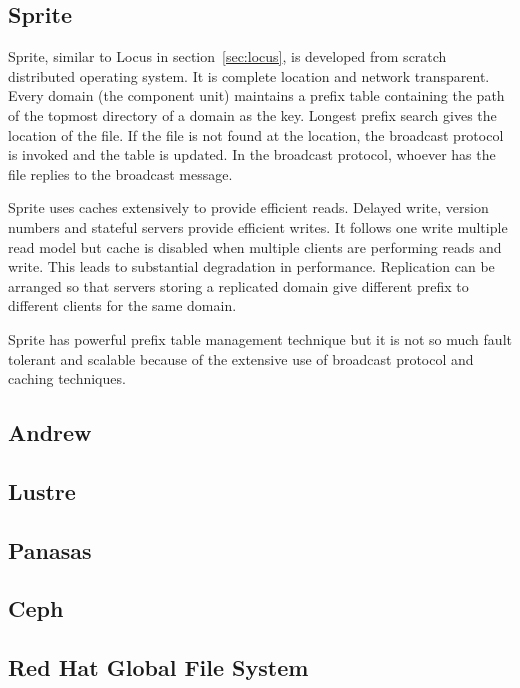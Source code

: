 \documentclass[a4paper,12pt]{article}
\begin{document}
\subsection{Sprite \cite[p.~357]{old_dfs}}
Sprite, similar to Locus in section~\ref{sec:locus}, is developed from scratch distributed operating system. It is complete location and network transparent. Every domain (the component unit) maintains a prefix table containing the path of the topmost directory of a domain as the key. Longest prefix search gives the location of the file. If the file is not found at the location, the broadcast protocol is invoked and the table is updated. In the broadcast protocol, whoever has the file replies to the broadcast message.

Sprite uses caches extensively to provide efficient reads. Delayed write, version numbers and stateful servers provide efficient writes. It follows one write multiple read model but cache is disabled when multiple clients are performing reads and write. This leads to substantial degradation in performance. Replication can be arranged so that servers storing a replicated domain give different prefix to different clients for the same domain.

Sprite has powerful prefix table management technique but it is not so much fault tolerant and scalable because of the extensive use of broadcast protocol and caching techniques.

\subsection{Andrew \cite[p.~360]{old_dfs}}


\subsection{Lustre}

\subsection{Panasas}

\subsection{Ceph}

\subsection{Red Hat Global File System}
\end{document}

